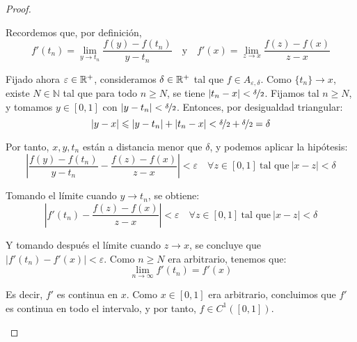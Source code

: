 \begin{ejercicio}
\begin{proof}
\begin{description}
                Recordemos que, por definición,
                \[
                f'(t_n) = \lim_{y \to t_n} \frac{f(y) - f(t_n)}{y - t_n}
                \quad \text{y} \quad
                f'(x) = \lim_{z \to x} \frac{f(z) - f(x)}{z - x}
                \]

                Fijado ahora $\veps\in \bb{R}^+$, consideramos $\delta \in \bb{R}^+$ tal que \( f \in A_{\varepsilon,\delta} \).  Como \( \{t_n\} \to x \), existe \( N \in \mathbb{N} \) tal que para todo \( n \geq N \), se tiene \( |t_n - x| < \nicefrac{\delta}{2} \). Fijamos tal \( n \geq N \), y tomamos \( y \in [0,1] \) con \( |y - t_n| < \nicefrac{\delta}{2} \). Entonces, por desigualdad triangular:
                \[
                |y - x| \leq |y - t_n| + |t_n - x| < \nicefrac{\delta}{2} + \nicefrac{\delta}{2} = \delta
                \]

                Por tanto, \( x, y, t_n \) están a distancia menor que \( \delta \), y podemos aplicar la hipótesis:
                \[
                \left| \frac{f(y) - f(t_n)}{y - t_n} - \frac{f(z) - f(x)}{z - x} \right| < \varepsilon
                \quad \forall z\in [0,1]\ \text{tal que}\ |x-z|<\delta
                \]

                Tomando el límite cuando \( y \to t_n \), se obtiene:
                \[
                \left| f'(t_n) - \frac{f(z) - f(x)}{z - x} \right| < \varepsilon
                \quad \forall z\in [0,1]\ \text{tal que}\ |x-z|<\delta
                \]

                Y tomando después el límite cuando \( z \to x \), se concluye que $|f'(t_n) - f'(x)| < \varepsilon$. Como $n\geq N$ era arbitrario, tenemos que:
                \[
                \lim_{n \to \infty} f'(t_n) = f'(x)
                \]

                Es decir, \( f' \) es continua en \( x \). Como \( x \in [0,1] \) era arbitrario, concluimos que \( f' \) es continua en todo el intervalo, y por tanto, \( f \in C^1([0,1]) \).
            \end{description}
        \end{proof}
    \end{ejercicio}

